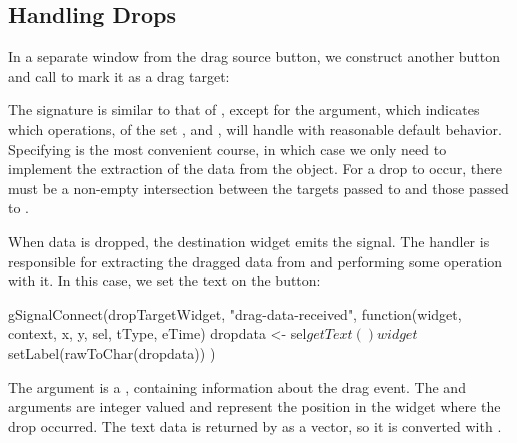 \subsection{Handling Drops}

In a separate window from the drag source button, we construct another
button and call  to mark it as a drag target:
\begin{Schunk}
\end{Schunk}
%
The signature is similar to that of ,
except for the  argument, which
indicates which operations, of the set , 
and , \GTK\/ will handle with reasonable default
behavior. Specifying  is the most convenient course, in
which case we only need to implement the extraction of the data from
the  object. For a drop to occur, there must be a
non-empty intersection between the targets passed to
 and those passed to
.

When data is dropped, the destination widget emits the
 signal. The handler is responsible for
extracting the dragged data from  and performing some
operation with it. In this case, we set the text on the button:
\begin{Schunk}
\begin{Sinput}
 gSignalConnect(dropTargetWidget, "drag-data-received", 
        function(widget, context, x, y, sel, tType, eTime) {
          dropdata <- sel$getText()
          widget$setLabel(rawToChar(dropdata))
        })
\end{Sinput}
\end{Schunk}
%
The  argument is a ,
containing information about the drag event. The  and
 arguments are integer valued and represent the position
in the widget where the drop occurred. The text data is returned by
 as a  vector, so it is converted with
.


